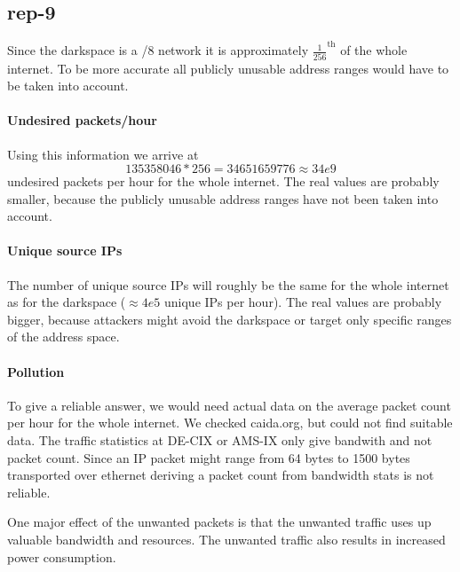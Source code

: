 \documentclass{article}
\begin{document}
\subsection{rep-9}

Since the darkspace is a /8 network it is approximately $\frac{1}{256}^{\text{th}}$ of the whole internet.
To be more accurate all publicly unusable address ranges would have to be taken into account.

\paragraph{Undesired packets/hour}
Using this information we arrive at
\[
    135358046 * 256 = 34651659776 \approx 34e9
\] undesired packets per hour for the whole internet. The real values are probably smaller, because
the publicly unusable address ranges have not been taken into account.

\paragraph{Unique source IPs}
The number of unique source IPs will roughly be the same for the whole internet as for the darkspace
($\approx 4e5$ unique IPs per hour).  The real values are probably bigger, because attackers might
avoid the darkspace or target only specific ranges of the address space.

\paragraph{Pollution}

To give a reliable answer, we would need actual data on the average packet count per hour for the
whole internet. We checked caida.org, but could not find suitable data. The traffic statistics at DE-CIX or
AMS-IX only give bandwith and not packet count. Since an IP packet might range from 64 bytes to 1500 bytes transported over ethernet deriving a packet count from bandwidth stats is not reliable.

One major effect of the unwanted packets is that the unwanted traffic uses up
valuable bandwidth and resources. The unwanted traffic also results in increased power consumption.
\end{document}
